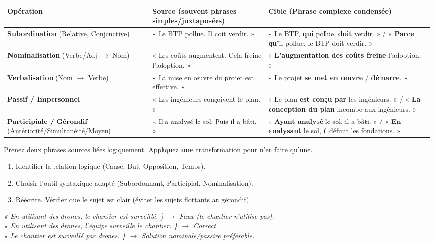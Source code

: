 \documentclass[11pt]{article}
\begin{document}
\begin{propriete}
\begin{center}
\begin{tabularx}{\linewidth}{|l|X|X|}\hline
\textbf{Opération} & \textbf{Source (souvent phrases simples/juxtaposées)} & \textbf{Cible (Phrase complexe condensée)} \\ \hline
\textbf{Subordination} (Relative, Conjonctive) & « Le BTP pollue. Il doit verdir. » & « Le BTP, \textbf{qui} pollue, \textbf{doit} verdir. » / « \textbf{Parce qu'}il pollue, le BTP doit verdir. » \\ \hline
\textbf{Nominalisation} (Verbe/Adj $\rightarrow$ Nom) & « Les coûts augmentent. Cela freine l'adoption. » & « \textbf{L'augmentation des coûts freine} l'adoption. » \\ \hline
\textbf{Verbalisation} (Nom $\rightarrow$ Verbe) & « La mise en œuvre du projet est effective. » & « Le projet \textbf{se met en œuvre} / \textbf{démarre}. » \\ \hline
\textbf{Passif / Impersonnel} & « Les ingénieurs conçoivent le plan. » & « Le plan \textbf{est conçu par} les ingénieurs. » / « \textbf{La conception du plan} incombe aux ingénieurs. » \\ \hline
\textbf{Participiale / Gérondif} (Antériorité/Simultanéité/Moyen) & « Il a analysé le sol. Puis il a bâti. » & « \textbf{Ayant analysé} le sol, il a bâti. » / « \textbf{En analysant} le sol, il définit les fondations. » \\ \hline
\end{tabularx}
\end{center}
\end{propriete}

\begin{methode}
Prenez deux phrases sources liées logiquement. Appliquez \textbf{une} transformation pour n'en faire qu'une.
\begin{enumerate}
    \item Identifier la relation logique (Cause, But, Opposition, Temps).
    \item Choisir l'outil syntaxique adapté (Subordonnant, Participial, Nominalisation).
    \item Réécrire. Vérifier que le sujet est clair (éviter les sujets flottants au gérondif).
\end{enumerate}
\end{methode}

\begin{attention}
\emph{« En utilisant des drones, le chantier est surveillé. \} $\rightarrow$ Faux (le chantier n'utilise pas).} \\
\emph{« En utilisant des drones, l'équipe surveille le chantier. \} $\rightarrow$ Correct.} \\
\emph{« Le chantier est surveillé par drones. \} $\rightarrow$ Solution nominale/passive préférable.}
\end{attention}
\end{document}
